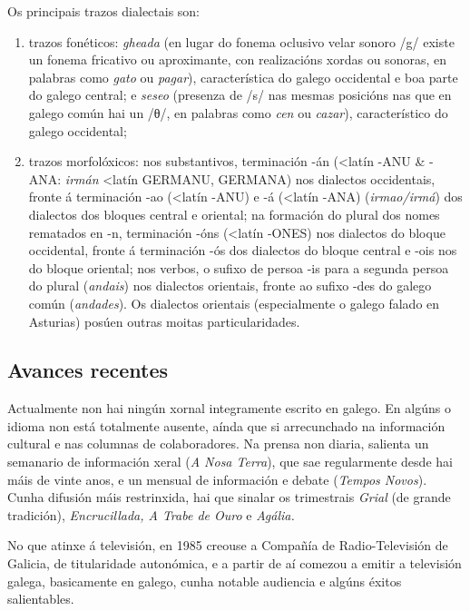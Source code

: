\begin{multicols}{2}
Os principais trazos dialectais son:

\begin{enumerate}
	\item trazos fonéticos: \textit{gheada} (en lugar do fonema oclusivo velar sonoro /g/ existe un fonema fricativo ou aproximante, con realizacións xordas ou sonoras, en palabras como \textit{gato} ou \textit{pagar}), característica do galego occidental e boa parte do galego central; e \textit{seseo} (presenza de /s/ nas mesmas posicións nas que en galego común hai un /θ/, en palabras como \textit{cen} ou \textit{cazar}), característico do galego occidental; 
	\item trazos morfolóxicos: nos substantivos, terminación -án (<latín -ANU \& -ANA: \textit{irmán} <latín GERMANU, GERMANA) nos dialectos occidentais, fronte á terminación -ao (<latín -ANU) e -á (<latín -ANA) (\textit{irmao/irmá}) dos dialectos dos bloques central e oriental; na formación do plural dos nomes rematados en -n, terminación -óns (<latín -ONES) nos dialectos do bloque occidental, fronte á terminación -ós dos dialectos do bloque central e -ois nos do bloque oriental; nos verbos, o sufixo de persoa -is para a segunda persoa do plural (\textit{andais}) nos dialectos orientais, fronte ao sufixo -des do galego común (\textit{andades}). Os dialectos orientais (especialmente o galego falado en Asturias) posúen outras moitas particularidades.
\end{enumerate}

\subsection{Avances recentes}
%

Actualmente  non hai ningún xornal integramente escrito en galego. En algúns o idioma non está totalmente ausente, aínda que si arrecunchado na información cultural e nas columnas de colaboradores. Na prensa non diaria, salienta un semanario de información xeral (\textit{A Nosa Terra}), que sae regularmente desde hai máis de vinte anos, e un mensual de información e debate (\textit{Tempos Novos}). Cunha difusión máis restrinxida, hai que sinalar os trimestrais \textit{Grial} (de grande tradición), \textit{Encrucillada, A Trabe de Ouro} e \textit{Agália.}

No que atinxe á televisión, en 1985 creouse a Compañía de Radio-Televisión de Galicia, de titularidade autonómica, e a partir de aí comezou a emitir a televisión galega, basicamente en galego, cunha notable audiencia e algúns éxitos salientables. 


\end{multicols}
